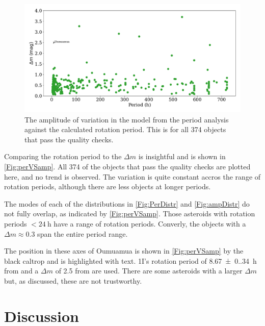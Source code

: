 \documentclass{UCreport}
\DeclareRobustCommand{\okina}{%
  \raisebox{\dimexpr\fontcharht\font`A-\height}{%
    \scalebox{0.8}{`}%
  }%
}
\newcommand{\omuamua}{\okina Oumuamua }
\begin{document}
\begin{figure}[h]
  \centering
  \includegraphics[width = \textwidth]{./Figures/QualPervsAmp1I.pdf}
  \caption[Amplitude of Variation against Rotation Period]{The amplitude of variation in the model from the period analysis against the calculated rotation period.
    This is for all 374 %
    objects that pass the quality checks.
  }
  \label{Fig:perVSamp}
\end{figure}


Comparing the rotation period to the $\Delta m$ is insightful and is shown in \autoref{Fig:perVSamp}.
All 374 of the objects that pass the quality checks are plotted here, and no trend is observed.
The variation is quite constant accros the range of rotation periods, although there are less objects at longer periods.

The modes of each of the distributions in \autoref{Fig:PerDistr} and \autoref{Fig:ampDistr} do not fully overlap, as indicated by \autoref{Fig:perVSamp}.
Those asteroids with rotation periods $<\qty{24}{\hour}$ have a range of rotation periods.
Converly, the objects with a $\Delta m \approx 0.3$ span the entire period range.

The position in these axes of \omuamua is shown in \autoref{Fig:perVSamp} by the black caltrop and is highlighted with text.
1I's rotation period of \qty{8.67(0.34)}{\hour} from \citet{Belton2018} and a $\Delta m$ of \qty{2.5}{\mag} from \citet{Meech2017} are used.
There are some asteroids with a larger $\Delta m$ but, as discussed, these are not trustworthy.





\section{Discussion}\label{Sec:Disc}
\end{document}
